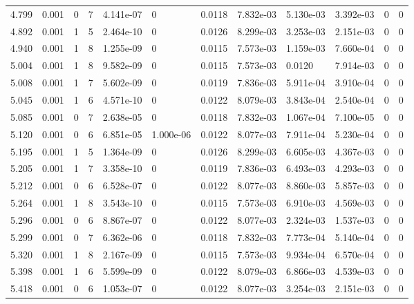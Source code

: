 \documentclass[preview]{standalone}
\begin{document}
{{{{\begin{tabular}{L{1.2cm}C{1.2cm} C{0.3cm}C{0.5cm} C{1.4cm}C{1.4cm} C{1.4cm}C{1.4cm} C{1.6cm}C{1.6cm} C{1.6cm}C{1.6cm}}
  4.799  &  0.001  & 0     &  7 &  4.141e-07  & 0  &  0.0118&   7.832e-03& 5.130e-03 & 3.392e-03   &  0 & 0  \\ 
  4.892  &  0.001  & 1     &  5 &  2.464e-10  & 0  &  0.0126&   8.299e-03& 3.253e-03 & 2.151e-03   &  0 & 0  \\ 
  4.940  &  0.001  & 1     &  8 &  1.255e-09  & 0  &  0.0115&   7.573e-03& 1.159e-03 & 7.660e-04   &  0 & 0  \\ 
  5.004  &  0.001  & 1     &  8 &  9.582e-09  & 0  &  0.0115&   7.573e-03& 0.0120 & 7.914e-03   &  0 & 0  \\ 
  5.008  &  0.001  & 1     &  7 &  5.602e-09  & 0  &  0.0119&   7.836e-03& 5.911e-04 & 3.910e-04   &  0 & 0  \\ 
  5.045  &  0.001  & 1     &  6 &  4.571e-10  & 0  &  0.0122&   8.079e-03& 3.843e-04 & 2.540e-04   &  0 & 0  \\ 
  5.085  &  0.001  & 0     &  7 &  2.638e-05  & 0  &  0.0118&   7.832e-03& 1.067e-04 & 7.100e-05   &  0 & 0  \\ 
  5.120  &  0.001  & 0     &  6 &  6.851e-05  & 1.000e-06  &  0.0122&   8.077e-03& 7.911e-04 & 5.230e-04   &  0 & 0  \\ 
  5.195  &  0.001  & 1     &  5 &  1.364e-09  & 0  &  0.0126&   8.299e-03& 6.605e-03 & 4.367e-03   &  0 & 0  \\ 
  5.205  &  0.001  & 1     &  7 &  3.358e-10  & 0  &  0.0119&   7.836e-03& 6.493e-03 & 4.293e-03   &  0 & 0  \\ 
  5.212  &  0.001  & 0     &  6 &  6.528e-07  & 0  &  0.0122&   8.077e-03& 8.860e-03 & 5.857e-03   &  0 & 0  \\ 
  5.264  &  0.001  & 1     &  8 &  3.543e-10  & 0  &  0.0115&   7.573e-03& 6.910e-03 & 4.569e-03   &  0 & 0  \\ 
  5.296  &  0.001  & 0     &  6 &  8.867e-07  & 0  &  0.0122&   8.077e-03& 2.324e-03 & 1.537e-03   &  0 & 0  \\ 
  5.299  &  0.001  & 0     &  7 &  6.362e-06  & 0  &  0.0118&   7.832e-03& 7.773e-04 & 5.140e-04   &  0 & 0  \\ 
  5.320  &  0.001  & 1     &  8 &  2.167e-09  & 0  &  0.0115&   7.573e-03& 9.934e-04 & 6.570e-04   &  0 & 0  \\ 
  5.398  &  0.001  & 1     &  6 &  5.599e-09  & 0  &  0.0122&   8.079e-03& 6.866e-03 & 4.539e-03   &  0 & 0  \\ 
  5.418  &  0.001  & 0     &  6 &  1.053e-07  & 0  &  0.0122&   8.077e-03& 3.254e-03 & 2.151e-03   &  0 & 0  \\ 

\end{tabular}}}}}
\end{document}
